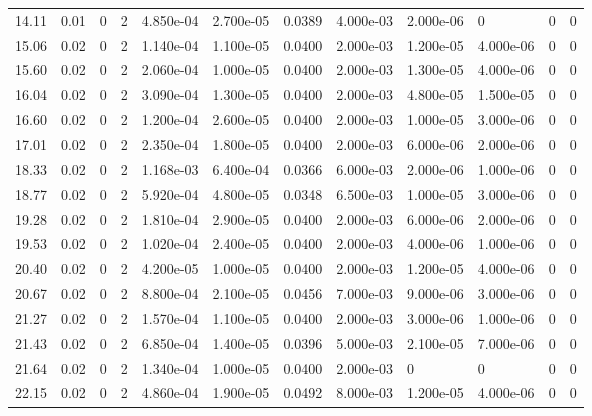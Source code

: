 \documentclass[preview]{standalone}
\begin{document}
{{\begin{tabular}{L{1.2cm}C{1.2cm} C{0.3cm}C{0.5cm} C{1.4cm}C{1.4cm} C{1.4cm}C{1.4cm} C{1.6cm}C{1.6cm} C{1.6cm}C{1.6cm}}
  14.11  &  0.01  & 0     &  2 &  4.850e-04  & 2.700e-05  &  0.0389&   4.000e-03& 2.000e-06 & 0   &  0 & 0  \\ 
  15.06  &  0.02  & 0     &  2 &  1.140e-04  & 1.100e-05  &  0.0400&   2.000e-03& 1.200e-05 & 4.000e-06   &  0 & 0  \\ 
  15.60  &  0.02  & 0     &  2 &  2.060e-04  & 1.000e-05  &  0.0400&   2.000e-03& 1.300e-05 & 4.000e-06   &  0 & 0  \\ 
  16.04  &  0.02  & 0     &  2 &  3.090e-04  & 1.300e-05  &  0.0400&   2.000e-03& 4.800e-05 & 1.500e-05   &  0 & 0  \\ 
  16.60  &  0.02  & 0     &  2 &  1.200e-04  & 2.600e-05  &  0.0400&   2.000e-03& 1.000e-05 & 3.000e-06   &  0 & 0  \\ 
  17.01  &  0.02  & 0     &  2 &  2.350e-04  & 1.800e-05  &  0.0400&   2.000e-03& 6.000e-06 & 2.000e-06   &  0 & 0  \\ 
  18.33  &  0.02  & 0     &  2 &  1.168e-03  & 6.400e-04  &  0.0366&   6.000e-03& 2.000e-06 & 1.000e-06   &  0 & 0  \\ 
  18.77  &  0.02  & 0     &  2 &  5.920e-04  & 4.800e-05  &  0.0348&   6.500e-03& 1.000e-05 & 3.000e-06   &  0 & 0  \\ 
  19.28  &  0.02  & 0     &  2 &  1.810e-04  & 2.900e-05  &  0.0400&   2.000e-03& 6.000e-06 & 2.000e-06   &  0 & 0  \\ 
  19.53  &  0.02  & 0     &  2 &  1.020e-04  & 2.400e-05  &  0.0400&   2.000e-03& 4.000e-06 & 1.000e-06   &  0 & 0  \\ 
  20.40  &  0.02  & 0     &  2 &  4.200e-05  & 1.000e-05  &  0.0400&   2.000e-03& 1.200e-05 & 4.000e-06   &  0 & 0  \\ 
  20.67  &  0.02  & 0     &  2 &  8.800e-04  & 2.100e-05  &  0.0456&   7.000e-03& 9.000e-06 & 3.000e-06   &  0 & 0  \\ 
  21.27  &  0.02  & 0     &  2 &  1.570e-04  & 1.100e-05  &  0.0400&   2.000e-03& 3.000e-06 & 1.000e-06   &  0 & 0  \\ 
  21.43  &  0.02  & 0     &  2 &  6.850e-04  & 1.400e-05  &  0.0396&   5.000e-03& 2.100e-05 & 7.000e-06   &  0 & 0  \\ 
  21.64  &  0.02  & 0     &  2 &  1.340e-04  & 1.000e-05  &  0.0400&   2.000e-03& 0 & 0   &  0 & 0  \\ 
  22.15  &  0.02  & 0     &  2 &  4.860e-04  & 1.900e-05  &  0.0492&   8.000e-03& 1.200e-05 & 4.000e-06   &  0 & 0  \\ 
\hline 
\end{tabular} 

}}
\end{document}
